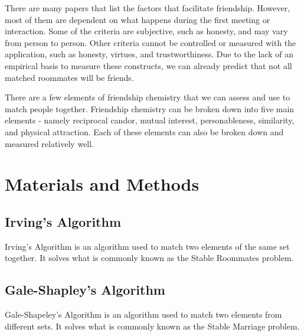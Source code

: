 \documentclass[journal]{./IEEE/IEEEtran}
\begin{document}
There are many papers that list the factors that facilitate friendship. However, most of them are dependent on what happens during the first meeting or interaction. Some of the criteria are subjective, such as honesty, and may vary from person to person. Other criteria cannot be controlled or measured with the application, such as honesty, virtues, and trustworthiness. Due to the lack of an empirical basis to measure these constructs, we can already predict that not all matched roommates will be friends.

There are a few elements of friendship chemistry that we can assess and use to match people together. Friendship chemistry can be broken down into five main elements - namely reciprocal candor, mutual interest, personableness, similarity, and physical attraction\cite{f_chemistry}. Each of these elements can also be broken down and measured relatively well.

\section{Materials and Methods}
\subsection{Irving's Algorithm}
Irving's Algorithm is an algorithm used to match two elements of the same set together. It solves what is commonly known as the Stable Roommates problem.

\subsection{Gale-Shapley's Algorithm}
Gale-Shapeley's Algorithm is an algorithm used to match two elements from different sets. It solves what is commonly known as the Stable Marriage problem.



\end{document}
